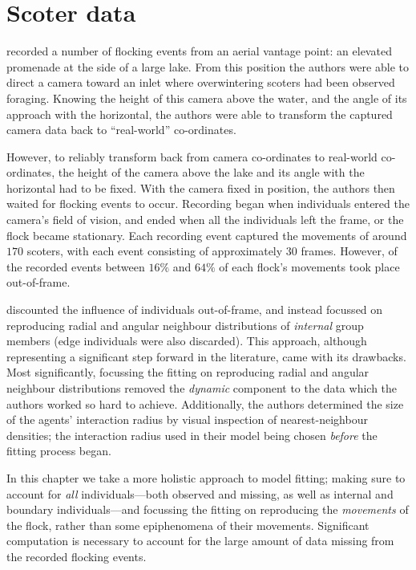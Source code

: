 \section{Scoter data}

\textcite{lukeman10} recorded a number of flocking events from an aerial
vantage point: an elevated promenade at the side of a large lake. From this
position the authors were able to direct a camera toward an inlet where
overwintering scoters had been observed foraging. Knowing the height of this
camera above the water, and the angle of its approach with the horizontal, the
authors were able to transform the captured camera data back to ``real-world''
co-ordinates.

However, to reliably transform back from camera co-ordinates to real-world
co-ordinates, the height of the camera above the lake and its angle with the
horizontal had to be fixed. With the camera fixed in position, the authors then
waited for flocking events to occur. Recording began when individuals entered
the camera's field of vision, and ended when all the individuals left the
frame, or the flock became stationary. Each recording event captured the
movements of around $170$ scoters, with each event consisting of approximately
$30$ frames. However, of the recorded events between $16\%$ and $64\%$ of each
flock's movements took place out-of-frame.

\textcite{lukeman10} discounted the influence of individuals out-of-frame, and
instead focussed on reproducing radial and angular neighbour distributions of
\emph{internal} group members (edge individuals were also discarded). This
approach, although representing a significant step forward in the literature,
came with its drawbacks. Most significantly, focussing the fitting on
reproducing radial and angular neighbour distributions removed the
\emph{dynamic} component to the data which the authors worked so hard to
achieve. Additionally, the authors determined the size of the agents'
interaction radius by visual inspection of nearest-neighbour densities; the
interaction radius used in their model being chosen \emph{before} the fitting
process began.

In this chapter we take a more holistic approach to model fitting; making sure
to account for \emph{all} individuals---both observed and missing, as well as
internal and boundary individuals---and focussing the fitting on reproducing
the \emph{movements} of the flock, rather than some epiphenomena of their
movements. Significant computation is necessary to account for the large amount
of data missing from the recorded flocking events.

